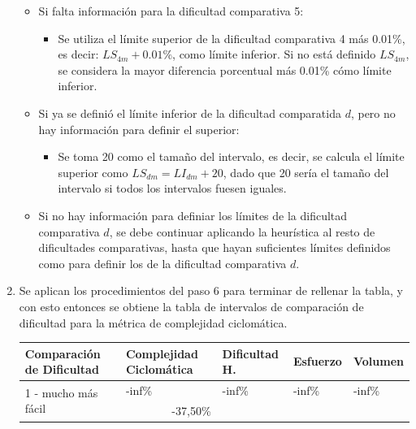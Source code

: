 \documentclass[letterpaper,12pt]{article}
\begin{document}
\begin{enumerate}
\begin{itemize}
\begin{itemize}
                \end{itemize}
          \item Si falta información para la dificultad comparativa 5:
                \begin{itemize}
                  \item Se utiliza el límite superior de la dificultad comparativa 4 más 0.01\%, es decir: $LS_{4m} + 0.01\%$, como límite inferior. Si no está definido $LS_{4m}$, se considera la mayor diferencia porcentual más 0.01\% cómo límite inferior.
                \end{itemize}
          \item Si ya se definió el límite inferior de la dificultad comparatida $d$, pero no hay información para definir el superior:
                \begin{itemize}
                  \item Se toma 20 como el tamaño del intervalo, es decir, se calcula el límite superior como $LS_{dm} = LI_{dm} + 20$, dado que 20 sería el tamaño del intervalo si todos los intervalos fuesen iguales.
                \end{itemize}
          \item Si no hay información para definiar los límites de la dificultad comparativa $d$, se debe continuar aplicando la heurística al resto de dificultades comparativas, hasta que hayan suficientes límites definidos como para definir los de la dificultad comparativa $d$.
        \end{itemize}
  \item Se aplican los procedimientos del paso 6 para terminar de rellenar la tabla, y con esto entonces se obtiene la tabla de intervalos de comparación de dificultad para la métrica de complejidad ciclomática.
        \begin{table}[H]
          \centering
          \begin{tabular}{|l|r|l|l|l|}
            \hline
            \textbf{Comparación de Dificultad}     & \multicolumn{1}{l|}{\textbf{Complejidad Ciclomática}} & \textbf{Dificultad H.} & \textbf{Esfuerzo} & \textbf{Volumen} \\ \hline
            \multirow{2}{*}{1 - mucho más fácil}   & \multicolumn{1}{l|}{-inf\%}                           & -inf\%                 & -inf\%            & -inf\%           \\ \cline{2-5}
                                                   & -37,50\%                                              &                        &                   &                  \\ \hline

\end{tabular}
\end{table}
\end{enumerate}
\end{document}
